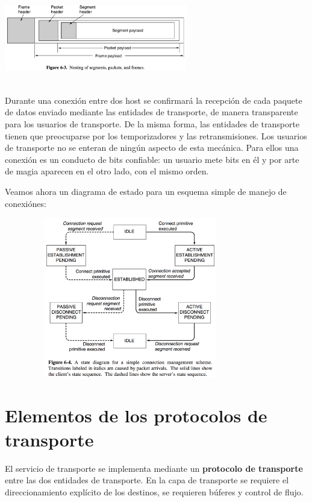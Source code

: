 \documentclass[10pt,a4paper]{report}
\begin{document}
\begin{center}
	\includegraphics[width=8cm, height=4cm]{./imagenes/segmentos.png} 
\end{center}

\par Durante una conexión entre dos host se confirmará la recepción de cada 
paquete de datos enviado mediante las entidades de transporte, de manera 
transparente para los usuarios de transporte. De la misma forma, las entidades de 
transporte tienen que preocuparse por los temporizadores y las retransmisiones. Los 
usuarios de transporte no se enteran de ningún aspecto de esta mecánica. Para ellos 
una conexión es un conducto de bits confiable: un usuario mete bits en él y por arte 
de magia aparecen en el otro lado, con el mismo orden.

\par Veamos ahora un diagrama de estado para un esquema simple de manejo de 
conexiónes:

\begin{center}
	\includegraphics[width=11cm, height=7cm]{./imagenes/diagrama.png} 
\end{center}


\section{Elementos de los protocolos de transporte}
	\par El servicio de transporte se implementa mediante un \textbf{protocolo de 
transporte} entre las dos entidades de transporte. En la capa de transporte se requiere 
el direccionamiento explícito de los destinos, se requieren búferes y control de flujo.
\end{document}
